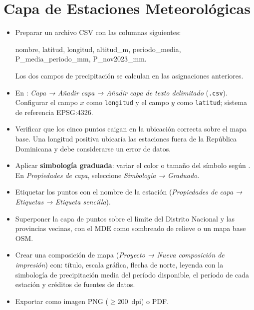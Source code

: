 \documentclass[11pt]{article}
\begin{document}
\section{Capa de Estaciones Meteorológicas}


\begin{itemize}
  \item Preparar un archivo CSV con las columnas siguientes:
    \begin{center}\small\ttfamily
      nombre, latitud, longitud, altitud\_m, periodo\_media,\\
      P\_media\_periodo\_mm, P\_nov2023\_mm.
    \end{center}
    Los dos campos de precipitación se calculan en las asignaciones anteriores.

  \item En \qgis{}: \emph{Capa → Añadir capa → Añadir capa de texto delimitado}
    (\texttt{.csv}).  Configurar el campo $x$ como \texttt{longitud} y el campo $y$
    como \texttt{latitud}; sistema de referencia EPSG:4326.

  \item Verificar que los cinco puntos caigan en la ubicación correcta sobre el
    mapa base. Una longitud positiva ubicaría las estaciones fuera de la República
    Dominicana y debe considerarse un error de datos.

  \item Aplicar \textbf{simbología graduada}: variar el color o tamaño del símbolo
    según . En \emph{Propiedades de capa}, seleccione
    \emph{Simbología → Graduado}.

  \item Etiquetar los puntos con el nombre de la estación (\emph{Propiedades de
    capa → Etiquetas → Etiqueta sencilla}).
\end{itemize}


\begin{itemize}
  \item Superponer la capa de puntos sobre el límite del Distrito Nacional y
    las provincias vecinas, con el MDE como sombreado de relieve o un mapa base OSM.
  \item Crear una composición de mapa (\emph{Proyecto → Nueva composición de
    impresión}) con: título, escala gráfica, flecha de norte, leyenda con
    la simbología de precipitación media del período disponible, el período de
    cada estación y créditos de fuentes de datos.
  \item Exportar como imagen PNG ($\geq 200$~dpi) o PDF.
\end{itemize}
\end{document}
